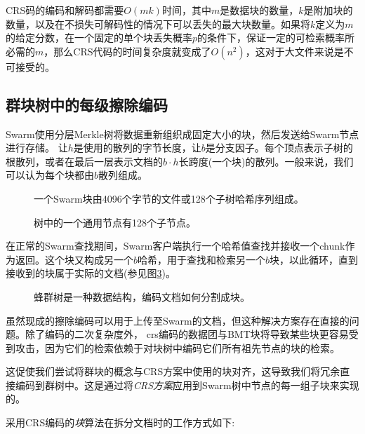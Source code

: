 CRS码的编码和解码都需要$O(mk)$时间，其中$m$是数据块的数量，$k$是附加块的数量，以及在不损失可解码性的情况下可以丢失的最大块数量。如果将$k$定义为$m$的给定分数，在一个固定的单个块丢失概率$p$的条件下，保证一定的可检索概率所必需的$m$，那么CRS代码的时间复杂度就变成了$O(n^2)$，这对于大文件来说是不可接受的。 

\subsection{群块树中的每级擦除编码\statusgreen}

Swarm使用分层Merkle树\cite{merkle1980protocols}将数据重新组织成固定大小的块，然后发送给Swarm节点进行存储。
让$h$是使用的散列的字节长度，让$b$是分支因子。每个顶点表示子树的根散列，或者在最后一层表示文档的$b\cdot h$长跨度(一个块)的散列。一般来说，我们可以认为每个块都由$b$散列组成。


\begin{figure}[htbp]
   \centering
   
   \caption[群块\statusgreen]{一个Swarm块由4096个字节的文件或128个子树哈希序列组成。}
   \label{fig:chunk}
\end{figure}


\begin{figure}[htbp]
   \centering
   
   \caption[树中的一个通用节点有128个子\statusgreen]{树中的一个通用节点有128个子节点。}
   \label{fig:Swarm-hash-basic}
\end{figure}

在正常的Swarm查找期间，Swarm客户端执行一个哈希值查找并接收一个chunk作为返回。这个块又构成另一个$b$哈希，用于查找和检索另一个$b$块，以此循环，直到接收到的块属于实际的文档(参见图\ref{fig:Swarm-hash-split})。


\begin{figure}[htbp]
   \centering
   
   \caption[群集哈希分裂\statusgreen]{蜂群树是一种数据结构，编码文档如何分割成块。}
   \label{fig:Swarm-hash-split}
\end{figure}

虽然现成的擦除编码可以用于上传至Swarm的文档，但这种解决方案存在直接的问题。除了编码的二次复杂度外， crs编码的数据团与BMT块将导致某些块更容易受到攻击，因为它们的检索依赖于对块树中编码它们所有祖先节点的块的检索。

这促使我们尝试将群块的概念与CRS方案中使用的块对齐，这导致我们将冗余直接编码到群树中。这是通过将\emph{CRS方案}应用到Swarm树中节点的每一组子块来实现的。

采用CRS编码的\emph{块}算法在拆分文档时的工作方式如下:


